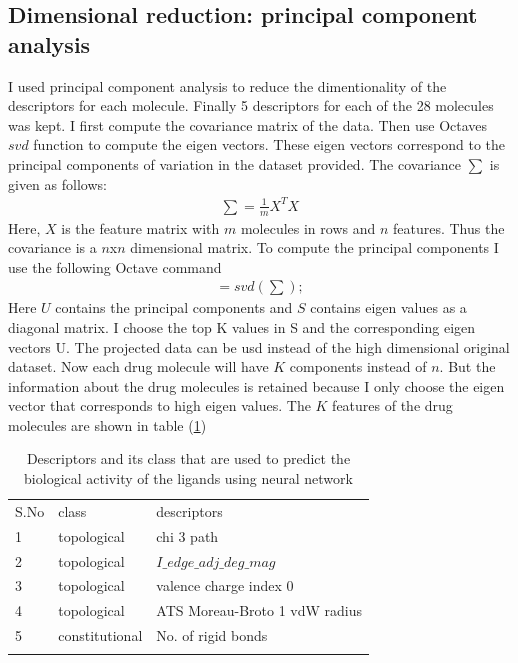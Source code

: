 \documentclass[twocolumn]{article}
\begin{document}
\subsection{Dimensional reduction: principal component analysis}
      I used principal component analysis to reduce the dimentionality of the descriptors for each molecule. Finally 5 descriptors for each of
      the 28 molecules was kept. I first compute the covariance matrix of the data. Then use Octaves $svd$ function to compute the eigen vectors. These eigen vectors correspond to the principal components of variation in the dataset provided. The covariance $\sum$ is given as follows:
      \begin{align*}
	      \sum = \frac{1}{m}X^TX
      \end{align*}
      Here, $X$ is the feature matrix with $m$ molecules in rows and $n$ features. Thus the covariance is a $n$x$n$ dimensional  matrix.
      To compute the principal components I use the following Octave command
      \begin{align*}
	      [U,S,V] = svd(\sum);
      \end{align*}
     Here $U$ contains the principal components and $S$ contains eigen values as a diagonal matrix. I choose the top K values in S and the corresponding eigen vectors U. The projected data can be usd instead of the high dimensional original dataset. Now each drug molecule will have $K$ components instead of $n$. But the information about the drug molecules is retained because I only choose the eigen vector that corresponds to high eigen values. The $K$ features of the drug molecules are shown in table (\ref{tab:table1})
\begin{table}[htb]
\caption{Descriptors and its class that are used to predict the biological
activity of the ligands using neural network}
\label{tab:table1}
\begin{tabular}{lll}
\hline\noalign{\smallskip}
S.No & class & descriptors\\
\noalign{\smallskip}\hline\noalign{\smallskip}
1 & topological & chi 3 path\\
2 & topological & $I\_edge\_adj\_deg\_mag$\\
3 & topological & valence charge index 0\\
4 &  topological & ATS Moreau-Broto 1 vdW radius\\
5 & constitutional & No. of rigid bonds\\
\noalign{\smallskip}\hline
\end{tabular}
\end{table}
\end{document}
